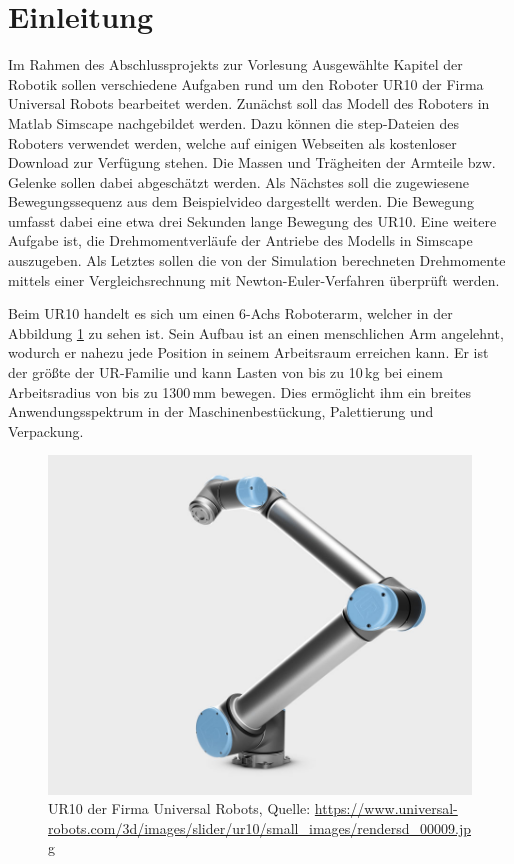 \section{Einleitung}

Im Rahmen des Abschlussprojekts zur Vorlesung Ausgewählte Kapitel der Robotik sollen verschiedene Aufgaben rund um den Roboter UR10 der Firma Universal Robots bearbeitet werden.
Zunächst soll das Modell des Roboters in Matlab Simscape nachgebildet werden.
Dazu können die step-Dateien des Roboters verwendet werden, welche auf einigen Webseiten als kostenloser Download zur Verfügung stehen.
Die Massen und Trägheiten der Armteile bzw. Gelenke sollen dabei abgeschätzt werden.
Als Nächstes soll die zugewiesene Bewegungssequenz aus dem Beispielvideo dargestellt werden.
Die Bewegung umfasst dabei eine etwa drei Sekunden lange  Bewegung des UR10.
Eine weitere Aufgabe ist, die Drehmomentverläufe der Antriebe des Modells in Simscape auszugeben.
Als Letztes sollen die von der Simulation berechneten Drehmomente mittels einer Vergleichsrechnung mit Newton-Euler-Verfahren überprüft werden. 


Beim UR10 handelt es sich um einen 6-Achs Roboterarm, welcher in der Abbildung \ref{fig:ur10} zu sehen ist.
Sein Aufbau ist an einen menschlichen Arm angelehnt, wodurch er nahezu jede Position in seinem Arbeitsraum erreichen kann.
Er ist der größte der UR-Familie und kann Lasten von bis zu 10\,kg bei einem Arbeitsradius von bis zu 1300\,mm bewegen.
Dies ermöglicht ihm ein breites Anwendungsspektrum in der Maschinenbestückung, Palettierung und Verpackung.\cite{ur}

\begin{figure}[!htbp]
	\centering
	\includegraphics[width=0.7\linewidth]{grafic/ur10_universal_robots}
	\caption{UR10 der Firma Universal Robots, Quelle: \url{https://www.universal-robots.com/3d/images/slider/ur10/small_images/rendersd_00009.jpg}}
	\label{fig:ur10}
\end{figure}

